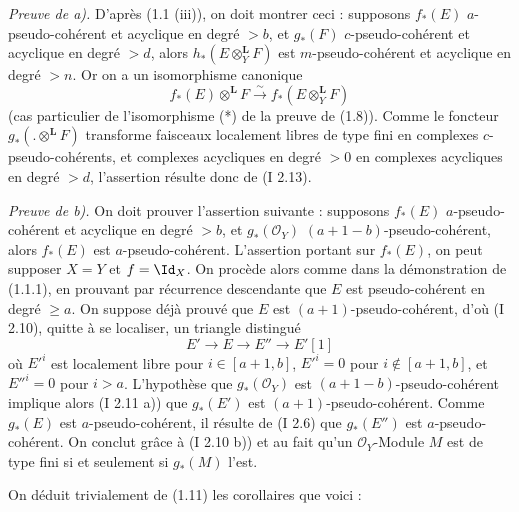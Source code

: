 \emph{Preuve de a).} D'après (1.1 (iii)), on doit montrer ceci : supposons \(f_*(E)\) \(a\)-pseudo-cohérent et acyclique en degré \(>b\), et \(g_*(F)\) \(c\)-pseudo-cohérent et acyclique en degré \(>d\), alors \(h_*(E\otimes_Y^{\mathbf L}F)\) est \(m\)-pseudo-cohérent et acyclique en degré \(>n\). Or on a un isomorphisme canonique
\[
  f_*(E)\otimes^{\mathbf L}F\xrightarrow{\sim} f_*(E\otimes_Y^{\mathbf L}F)
\]
(cas particulier de l'isomorphisme (*) de la preuve de (1.8)). Comme le foncteur \(g_*(.\otimes^{\mathbf L}F)\) transforme faisceaux localement libres de type fini en complexes \(c\)-pseudo-cohérents, et complexes acycliques en degré \(>0\) en complexes acycliques en degré \(>d\), l'assertion résulte donc de (I 2.13).

\emph{Preuve de b).} On doit prouver l'assertion suivante : supposons \(f_*(E)\) \(a\)-pseudo-cohérent et acyclique en degré \(>b\), et \(g_*(\mathcal O_Y)\) \((a+1-b)\)-pseudo-cohérent, alors \(f_*(E)\) est \(a\)-pseudo-cohérent. L'assertion portant sur \(f_*(E)\), on peut supposer \(X=Y\) et \(f=\Id_X\). On procède alors comme dans la démonstration de (1.1.1), en prouvant par récurrence descendante que \(E\) est pseudo-cohérent en degré \(\ge a\). On suppose déjà prouvé que \(E\) est \((a+1)\)-pseudo-cohérent, d'où (I 2.10), quitte à se localiser, un triangle distingué
\[
E'\longrightarrow E\longrightarrow E''\longrightarrow E'[1]
\]
où \(E'^i\) est localement libre pour \(i\in[a+1,b]\), \(E'^i=0\) pour \(i\notin[a+1,b]\), et \(E''^i=0\) pour \(i>a\). L'hypothèse que \(g_*(\mathcal O_Y)\) est \((a+1-b)\)-pseudo-cohérent implique alors (I 2.11 a)) que \(g_*(E')\) est \((a+1)\)-pseudo-cohérent. Comme \(g_*(E)\) est \(a\)-pseudo-cohérent, il résulte de (I 2.6) que \(g_*(E'')\) est \(a\)-pseudo-cohérent. On conclut grâce à (I 2.10 b)) et au fait qu'un \(\mathcal O_Y\)-Module \(M\) est de type fini si et seulement si \(g_*(M)\) l'est.

On déduit trivialement de (1.11) les corollaires que voici :

